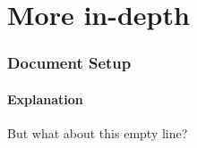 \section{More in-depth}

\begin{frame}
    \frametitle{Document Setup}
    \framesubtitle{Explanation}
    But what about this empty line?
    
\end{frame}





 

